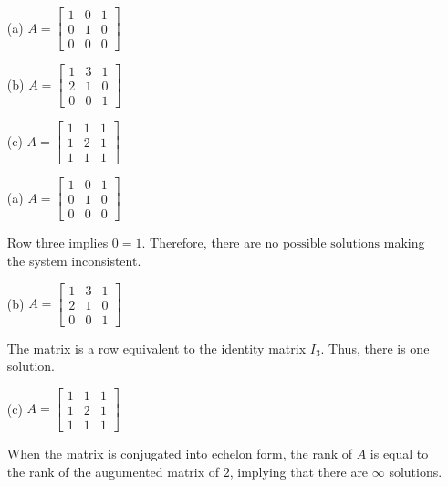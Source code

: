 \documentclass{report}
\begin{document}
\begin{enumerate}
    \item[(a)] \(A = \begin{bmatrix} 1 & 0 & 1 \\ 0 & 1 & 0 \\ 0 & 0 & 0 \end{bmatrix}\)
    \item[(b)] \(A = \begin{bmatrix} 1 & 3 & 1 \\ 2 & 1 & 0 \\ 0 & 0 & 1 \end{bmatrix}\)
    \item[(c)] \(A = \begin{bmatrix} 1 & 1 & 1 \\ 1 & 2 & 1 \\ 1 & 1 & 1 \end{bmatrix}\)
\end{enumerate}

\sol

\begin{enumerate}
\item[(a)] $A = \begin{bmatrix} 1 & 0 & 1 \\ 0 & 1 & 0 \\ 0 & 0 & 0 \end{bmatrix}$

Row three implies $0 = 1$. Therefore, there are $\boxed{\text{no possible solutions}}$ making the system inconsistent.

\item[(b)] $A = \begin{bmatrix} 1 & 3 & 1 \\ 2 & 1 & 0 \\ 0 & 0 & 1 \end{bmatrix}$

The matrix is a row equivalent to the identity matrix $I_3$. Thus, there is $\boxed{\text{one}}$ solution.

\item[(c)] $A = \begin{bmatrix} 1 & 1 & 1 \\ 1 & 2 & 1 \\ 1 & 1 & 1 \end{bmatrix}$

When the matrix is conjugated into echelon form, the rank of $A$ is equal to the rank of the augumented matrix of $2$, implying that there are $\boxed{\infty}$ solutions.	
\end{enumerate}
\end{document}
